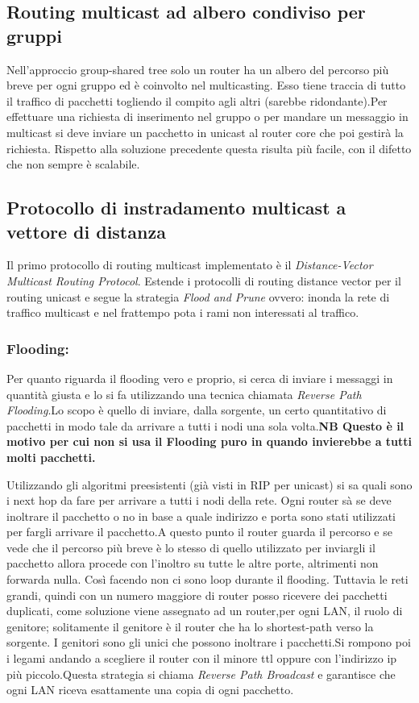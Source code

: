 \subsection{Routing multicast ad albero condiviso per gruppi}
Nell'approccio group-shared tree solo un router ha un albero del percorso più breve per ogni gruppo ed è coinvolto nel multicasting. Esso tiene traccia di tutto il traffico di pacchetti togliendo il compito agli altri (sarebbe ridondante).Per effettuare una richiesta di inserimento nel gruppo o per mandare un messaggio in multicast si deve inviare un pacchetto in unicast al router core che poi gestirà la richiesta. Rispetto alla soluzione precedente questa risulta più facile, con il difetto che non sempre è scalabile.
\subsection{Protocollo di instradamento multicast a vettore di distanza}\label{sec:Protocollo di instradamento multicast a vettore di distanza}
Il primo protocollo di routing multicast implementato è il \textit{Distance-Vector Multicast Routing Protocol}. Estende i protocolli di routing distance vector per il routing unicast e segue la strategia \textit{Flood and Prune} ovvero: inonda la rete di traffico multicast e nel frattempo pota i rami non interessati al traffico.
\subsubsection{Flooding:}
Per quanto riguarda il flooding vero e proprio, si cerca di inviare i messaggi in quantità giusta e lo si fa utilizzando una tecnica chiamata \textit{Reverse Path Flooding}.Lo scopo è quello di inviare, dalla sorgente, un certo quantitativo di pacchetti in modo tale da arrivare a tutti i nodi una sola volta.\textbf{NB Questo è il motivo per cui non si usa il Flooding puro in quando invierebbe a tutti molti pacchetti.}

Utilizzando gli algoritmi preesistenti (già visti in RIP per unicast) si sa quali sono i next hop da fare per arrivare a tutti i nodi della rete. Ogni router sà se deve inoltrare il pacchetto o no in base a quale indirizzo e porta sono stati utilizzati per fargli arrivare il pacchetto.A questo punto il router guarda il percorso e se vede che il percorso più breve è lo stesso di quello utilizzato per inviargli il pacchetto allora procede con l'inoltro su tutte le altre porte, altrimenti non forwarda nulla. Così facendo non ci sono loop durante il flooding. Tuttavia le reti grandi, quindi con un numero maggiore di router posso ricevere dei pacchetti duplicati, come soluzione viene assegnato ad un router,per ogni LAN, il ruolo di genitore; solitamente il genitore è il router che ha lo shortest-path verso la sorgente. I genitori sono gli unici che possono inoltrare i pacchetti.Si rompono poi i legami andando a scegliere il router con il minore ttl oppure con l'indirizzo ip più piccolo.Questa strategia si chiama \textit{Reverse Path Broadcast} e garantisce che ogni LAN riceva esattamente una copia di ogni pacchetto.

